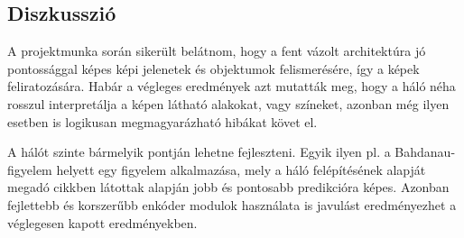 \begin{multicols}{2}
\section{Diszkusszió} \label{section:5}
A projektmunka során sikerült belátnom, hogy a fent vázolt architektúra jó pontossággal képes képi jelenetek és objektumok felismerésére, így a képek feliratozására. Habár a végleges eredmények azt mutatták meg, hogy a háló néha rosszul interpretálja a képen látható alakokat, vagy színeket, azonban még ilyen esetben is logikusan megmagyarázható hibákat követ el. \par
A hálót szinte bármelyik pontján lehetne fejleszteni. Egyik ilyen pl. a  Bahdanau-figyelem helyett egy  figyelem alkalmazása, mely a háló felépítésének alapját megadó  cikkben látottak alapján jobb és pontosabb predikcióra képes. Azonban fejlettebb és korszerűbb enkóder modulok használata is javulást eredményezhet a véglegesen kapott eredményekben.
\end{multicols}